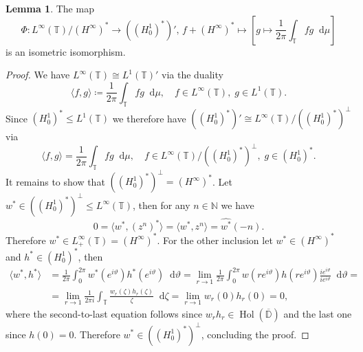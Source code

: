 \documentclass[letterpaper, 11pt]{article}
\newcommand{\D}{\mathbb{D}}
\newcommand{\T}{\mathbb{T}}
\newcommand{\N}{\mathbb{N}}
\newcommand{\1}{\mathds{1}}
\newcommand{\dd}{\mathop{}\!\mathrm{d}}
\newcommand{\cl}[1]{\overline{#1}}
\DeclareMathOperator*{\Hol}{Hol}
\theoremstyle{definition}
\newtheorem{lemma}[theorem]{Lemma}
\begin{document}
\begin{lemma}
  The map
  \begin{equation*}
    \Phi : L^\infty(\T) / (H^\infty)^* \to ((H_0^1)^*)',\, f + (H^\infty)^* \mapsto \left[ g \mapsto \frac{1}{2 \pi} \int_\T f g \dd \mu \right]
  \end{equation*}
  is an isometric isomorphism.
\end{lemma}

\begin{proof}
  We have $L^\infty(\T) \cong L^1(\T)'$ via the duality
  $$ \langle f, g \rangle \coloneqq \frac{1}{2\pi} \int_\T f g \dd \mu, \quad f \in L^\infty(\T),\; g \in L^1(\T). $$
  Since $(H_0^1)^* \leq L^1(\T)$ we therefore have $((H_0^1)^*)' \cong L^\infty(\T) / ((H_0^1)^*)^\perp$ via
  $$ \langle f, g \rangle = \frac{1}{2\pi} \int_\T f g \dd \mu, \quad f \in L^\infty(\T) / ((H_0^1)^*)^\perp,\; g \in (H_0^1)^*. $$
  It remains to show that $((H_0^1)^*)^\perp = (H^\infty)^*$. Let $w^* \in ((H_0^1)^*)^\perp \leq L^\infty(\T)$, then for any $n \in \N$ we have
  $$ 0 = \langle w^*, (z^n)^* \rangle = \langle w^*, z^n \rangle = \widehat{w^*}(-n). $$
  Therefore $w^* \in L_+^\infty(\T) = (H^\infty)^*$. For the other inclusion let $w^* \in (H^\infty)^*$ and $h^* \in (H_0^1)^*$, then
  \begin{align*}
    \langle w^*, h^* \rangle &= \frac{1}{2\pi} \int_0^{2 \pi} w^*(e^{i \vartheta}) h^*(e^{i \vartheta}) \dd \vartheta = \lim_{r \to 1} \frac{1}{2\pi} \int_0^{2 \pi} w(r e^{i \vartheta}) h(r e^{i \vartheta}) \frac{ie^{i \vartheta}}{ie^{i \vartheta}} \dd \vartheta = \\
    &= \lim_{r \to 1} \frac{1}{2\pi i} \int_\T \frac{w_r(\zeta) h_r(\zeta)}{\zeta} \dd \zeta = \lim_{r \to 1} w_r(0) h_r(0) = 0,
  \end{align*}
  where the second-to-last equation follows since $w_r h_r \in \Hol(\cl{\D})$ and the last one since $h(0) = 0$. Therefore $w^* \in ((H_0^1)^*)^\perp$, concluding the proof.
\end{proof}
  
\end{document}
